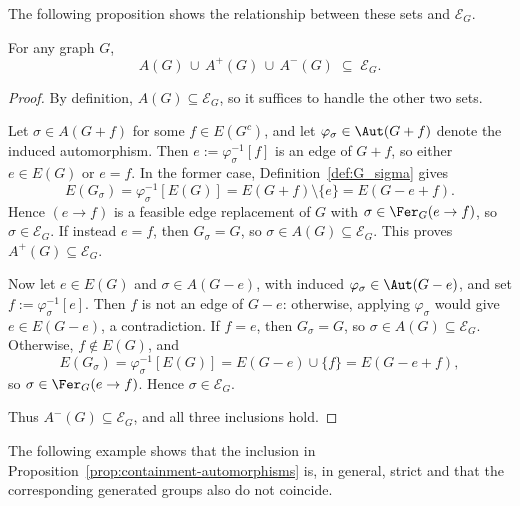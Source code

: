 The following proposition shows the relationship between these sets and $\mathcal E_G$.

\begin{proposition}\label{prop:containment-automorphisms}
    For any graph $G$,
    $$
        A(G)\,\cup\,A^+(G)\,\cup\,A^-(G)\;\subseteq\;\mathcal E_G.
    $$
\end{proposition}

\begin{proof}
    By definition, $A(G)\subseteq\mathcal E_G$, so it suffices to handle the other two sets.

    Let $\sigma\in A(G+f)$ for some $f\in E(G^c)$, and let $\varphi_\sigma\in\Aut(G+f)$ denote the induced automorphism.
    Then $e:=\varphi_\sigma^{-1}[f]$ is an edge of $G+f$, so either $e\in E(G)$ or $e=f$.
    In the former case, Definition~\ref{def:G_sigma} gives
    $$
        E(G_\sigma)=\varphi_\sigma^{-1}[E(G)]=E(G+f)\setminus\{e\}=E(G-e+f).
    $$
    Hence $(e\to f)$ is a feasible edge replacement of $G$ with $\sigma\in\Fer_G(e\to f)$, so $\sigma\in\mathcal E_G$.
    If instead $e=f$, then $G_\sigma=G$, so $\sigma\in A(G)\subseteq\mathcal E_G$.
    This proves $A^+(G)\subseteq\mathcal E_G$.

    Now let $e\in E(G)$ and $\sigma\in A(G-e)$, with induced $\varphi_\sigma\in\Aut(G-e)$, and set $f:=\varphi_\sigma^{-1}[e]$.
    Then $f$ is not an edge of $G-e$: otherwise, applying $\varphi_\sigma$ would give $e\in E(G-e)$, a contradiction.
    If $f=e$, then $G_\sigma=G$, so $\sigma\in A(G)\subseteq\mathcal E_G$.
    Otherwise, $f\notin E(G)$, and
    $$
        E(G_\sigma)=\varphi_\sigma^{-1}[E(G)]=E(G-e)\cup\{f\}=E(G-e+f),
    $$
    so $\sigma\in\Fer_G(e\to f)$.
    Hence $\sigma\in\mathcal E_G$.

    Thus $A^-(G)\subseteq\mathcal E_G$, and all three inclusions hold.
\end{proof}

The following example shows that the inclusion in Proposition~\ref{prop:containment-automorphisms} is, in general, strict and that the corresponding generated groups also do not coincide.

